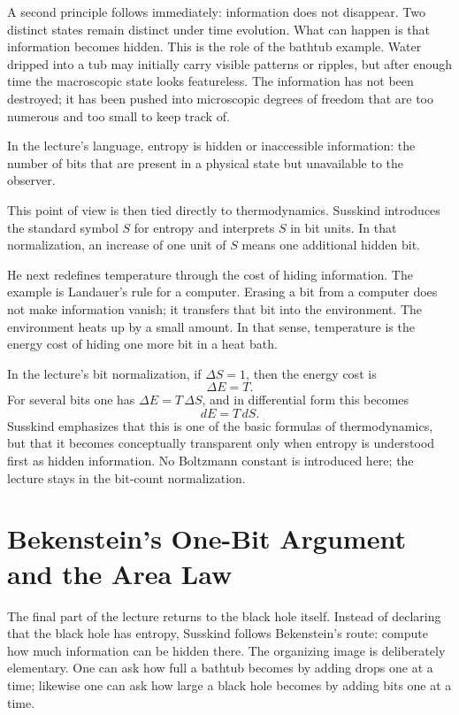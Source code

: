 A second principle follows immediately: information does not disappear. Two distinct states remain distinct under time evolution. What can happen is that information becomes hidden. This is the role of the bathtub example. Water dripped into a tub may initially carry visible patterns or ripples, but after enough time the macroscopic state looks featureless. The information has not been destroyed; it has been pushed into microscopic degrees of freedom that are too numerous and too small to keep track of.

\begin{definition}
In the lecture's language, entropy is hidden or inaccessible information: the number of bits that are present in a physical state but unavailable to the observer.
\end{definition}

This point of view is then tied directly to thermodynamics. Susskind introduces the standard symbol \(S\) for entropy and interprets \(S\) in bit units. In that normalization, an increase of one unit of \(S\) means one additional hidden bit.

He next redefines temperature through the cost of hiding information. The example is Landauer's rule for a computer. Erasing a bit from a computer does not make information vanish; it transfers that bit into the environment. The environment heats up by a small amount. In that sense, temperature is the energy cost of hiding one more bit in a heat bath.

In the lecture's bit normalization, if \(\Delta S=1\), then the energy cost is
\begin{equation}
\Delta E = T.
\end{equation}
For several bits one has \(\Delta E = T\,\Delta S\), and in differential form this becomes
\begin{equation}
dE = T\,dS.
\end{equation}
Susskind emphasizes that this is one of the basic formulas of thermodynamics, but that it becomes conceptually transparent only when entropy is understood first as hidden information. No Boltzmann constant is introduced here; the lecture stays in the bit-count normalization.

\section{Bekenstein's One-Bit Argument and the Area Law}

The final part of the lecture returns to the black hole itself. Instead of declaring that the black hole has entropy, Susskind follows Bekenstein's route: compute how much information can be hidden there. The organizing image is deliberately elementary. One can ask how full a bathtub becomes by adding drops one at a time; likewise one can ask how large a black hole becomes by adding bits one at a time.

